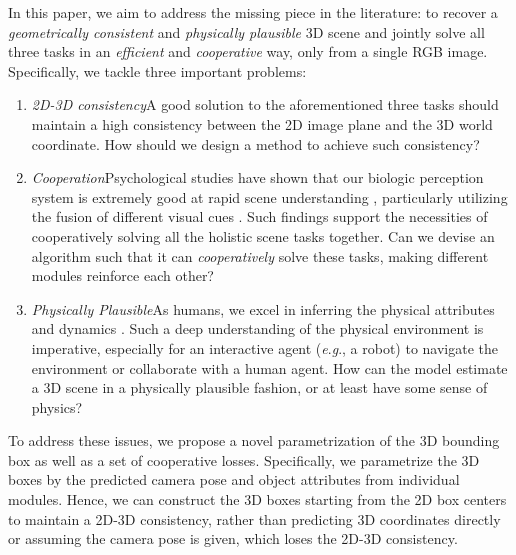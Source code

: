 \documentclass{article}
\makeatletter
\newcommand{\eg}{\textit{e}.\textit{g}.\@\xspace}
\makeatother
\begin{document}
In this paper, we aim to address the missing piece in the literature: to recover a \emph{geometrically consistent} and \emph{physically plausible} 3D scene and jointly solve all three tasks in an \emph{efficient} and \emph{cooperative} way, only from a single RGB image. Specifically, we tackle three important problems:
\begin{enumerate}[leftmargin=*,noitemsep,nolistsep]
    \item \emph{2D-3D consistency}\quad{}A good solution to the aforementioned three tasks should maintain a high consistency between the 2D image plane and the 3D world coordinate. How should we design a method to achieve such consistency?
    \item \emph{Cooperation}\quad{}Psychological studies have shown that our biologic perception system is extremely good at rapid scene understanding \citep{schyns1994blobs}, particularly utilizing the fusion of different visual cues \citep{landy1995measurement,jacobs2002determines}. Such findings support the necessities of cooperatively solving all the holistic scene tasks together. Can we devise an algorithm such that it can \emph{cooperatively} solve these tasks, making different modules reinforce each other?
    \item \emph{Physically Plausible}\quad{}As humans, we excel in inferring the physical attributes and dynamics \citep{kubricht2017intuitive}. Such a deep understanding of the physical environment is imperative, especially for an interactive agent (\eg, a robot) to navigate the environment or collaborate with a human agent. How can the model estimate a 3D scene in a physically plausible fashion, or at least have some sense of physics?
\end{enumerate}

To address these issues, we propose a novel parametrization of the 3D bounding box as well as a set of cooperative losses. Specifically, we parametrize the 3D boxes by the predicted camera pose and object attributes from individual modules. Hence, we can construct the 3D boxes starting from the 2D box centers to maintain a 2D-3D consistency, rather than predicting 3D coordinates directly or assuming the camera pose is given, which loses the 2D-3D consistency.
\end{document}
